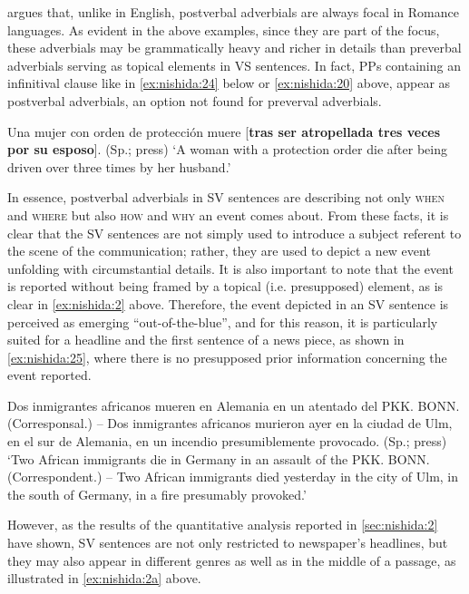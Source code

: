 \documentclass[output=paper,colorlinks,citecolor=brown,
]{langscibook}
\begin{document}
\citet{teixeira2016locative} argues that, unlike in English, postverbal adverbials are always focal in Romance languages. As evident in the above examples, since they are part of the focus, these adverbials may be grammatically heavy and richer in details than preverbal adverbials serving as topical elements in VS sentences. In fact, PPs containing an infinitival clause like in \ref{ex:nishida:24} below or \ref{ex:nishida:20} above, appear as postverbal adverbials, an option not found for preverval adverbials.  

\begin{exe}
    \ex\label{ex:nishida:24}
    
   Una mujer con orden de protección muere [\textbf{tras ser atropellada tres veces por su	esposo}]. (Sp.; press)
    \glt `A woman with a protection order die after being driven over three times by her husband.'
\end{exe}

In essence, postverbal adverbials in SV sentences are describing not only \textsc{when} and \textsc{where} but also \textsc{how} and \textsc{why} an event comes about. From these facts, it is clear that the SV sentences are not simply used to introduce a subject referent to the scene of the communication; rather, they are used to depict a new event unfolding with circumstantial details. It is also important to note that the event is reported without being framed by a topical (i.e. presupposed) element, as is clear in \ref{ex:nishida:2} above. Therefore, the event depicted in an SV sentence is perceived as emerging ``out-of-the-blue'', and for this reason, it is particularly suited for a headline and the first sentence of a news piece, as shown in \ref{ex:nishida:25}, where there is no presupposed prior information concerning the event reported. 


\begin{exe}
    \ex\label{ex:nishida:25}
  Dos inmigrantes africanos mueren en Alemania en un atentado del PKK. BONN. 	(Corresponsal.) – Dos inmigrantes africanos murieron ayer en la ciudad de Ulm, en el	sur de Alemania, en un incendio presumiblemente provocado. (Sp.; press) 
    \glt `Two African immigrants die in Germany in an assault of the PKK. BONN. 	(Correspondent.) – Two African immigrants died yesterday in the city of Ulm, in the south of Germany, in a fire presumably provoked.'
\end{exe}

However, as the results of the quantitative analysis reported in \ref{sec:nishida:2} have shown, SV sentences are not only restricted to newspaper's headlines, but they may also appear in different genres as well as in the middle of a passage, as illustrated in \ref{ex:nishida:2a} above. 
\end{document}
